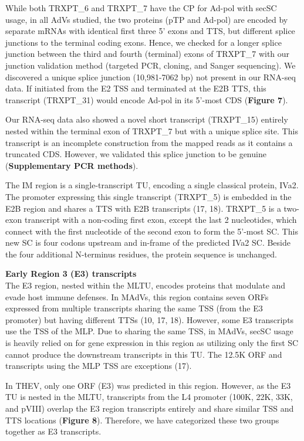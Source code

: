 \documentclass[
]{article}
\begin{document}
While both TRXPT\_6 and TRXPT\_7 have the CP for Ad-pol with secSC
usage, in all AdVs studied, the two proteins (pTP and Ad-pol) are
encoded by separate mRNAs with identical first three 5' exons and TTS,
but different splice junctions to the terminal coding exons. Hence, we
checked for a longer splice junction between the third and fourth
(terminal) exons of TRXPT\_7 with our junction validation method
(targeted PCR, cloning, and Sanger sequencing). We discovered a unique
splice junction (10,981-7062 bp) not present in our RNA-seq data. If
initiated from the E2 TSS and terminated at the E2B TTS, this transcript
(TRXPT\_31) would encode Ad-pol in its 5'-most CDS (\textbf{Figure 7}).

Our RNA-seq data also showed a novel short transcript (TRXPT\_15)
entirely nested within the terminal exon of TRXPT\_7 but with a unique
splice site. This transcript is an incomplete construction from the
mapped reads as it contains a truncated CDS. However, we validated this
splice junction to be genuine (\textbf{Supplementary PCR methods}).

The IM region is a single-transcript TU, encoding a single classical
protein, IVa2. The promoter expressing this single transcript (TRXPT\_5)
is embedded in the E2B region and shares a TTS with E2B transcripts (17,
18). TRXPT\_5 is a two-exon transcript with a non-coding first exon,
except the last 2 nucleotides, which connect with the first nucleotide
of the second exon to form the 5'-most SC. This new SC is four codons
upstream and in-frame of the predicted IVa2 SC. Beside the four
additional N-terminus residues, the protein sequence is unchanged.

\textbf{Early Region 3 (E3) transcripts}\\
The E3 region, nested within the MLTU, encodes proteins that modulate
and evade host immune defenses. In MAdVs, this region contains seven
ORFs expressed from multiple transcripts sharing the same TSS (from the
E3 promoter) but having different TTSs (10, 17, 18). However, some E3
transcripts use the TSS of the MLP. Due to sharing the same TSS, in
MAdVs, secSC usage is heavily relied on for gene expression in this
region as utilizing only the first SC cannot produce the downstream
transcripts in this TU. The 12.5K ORF and transcripts using the MLP TSS
are exceptions (17).

In THEV, only one ORF (E3) was predicted in this region. However, as the
E3 TU is nested in the MLTU, transcripts from the L4 promoter (100K,
22K, 33K, and pVIII) overlap the E3 region transcripts entirely and
share similar TSS and TTS locations (\textbf{Figure 8}). Therefore, we
have categorized these two groups together as E3 transcripts.
\end{document}
